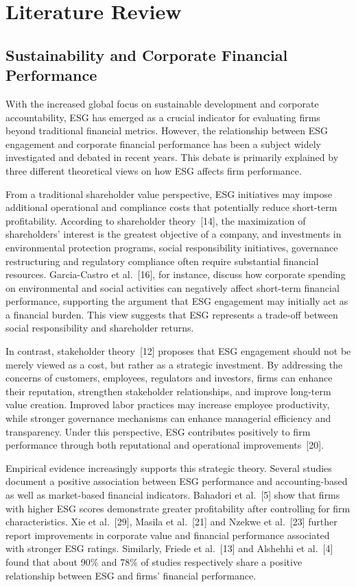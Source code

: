 \documentclass[12pt]{article}
\begin{document}
\section{Literature Review}\label{sec:lit}

\subsection{Sustainability and Corporate Financial Performance}
With the increased global focus on sustainable development and corporate accountability, ESG has emerged as a crucial indicator for evaluating firms beyond traditional financial metrics. However, the relationship between ESG engagement and corporate financial performance has been a subject widely investigated and debated in recent years. This debate is primarily explained by three different theoretical views on how ESG affects firm performance.

From a traditional shareholder value perspective, ESG initiatives may impose additional operational and compliance costs that potentially reduce short-term profitability. According to shareholder theory~[14], the maximization of shareholders' interest is the greatest objective of a company, and investments in environmental protection programs, social responsibility initiatives, governance restructuring and regulatory compliance often require substantial financial resources. Garcia-Castro et al.~[16], for instance, discuss how corporate spending on environmental and social activities can negatively affect short-term financial performance, supporting the argument that ESG engagement may initially act as a financial burden. This view suggests that ESG represents a trade-off between social responsibility and shareholder returns.

In contrast, stakeholder theory~[12] proposes that ESG engagement should not be merely viewed as a cost, but rather as a strategic investment. By addressing the concerns of customers, employees, regulators and investors, firms can enhance their reputation, strengthen stakeholder relationships, and improve long-term value creation. Improved labor practices may increase employee productivity, while stronger governance mechanisms can enhance managerial efficiency and transparency. Under this perspective, ESG contributes positively to firm performance through both reputational and operational improvements~[20].

Empirical evidence increasingly supports this strategic theory. Several studies document a positive association between ESG performance and accounting-based as well as market-based financial indicators. Bahadori et al.~[5] show that firms with higher ESG scores demonstrate greater profitability after controlling for firm characteristics. Xie et al.~[29], Masila et al.~[21] and Nzekwe et al.~[23] further report improvements in corporate value and financial performance associated with stronger ESG ratings. Similarly, Friede et al.~[13] and Alshehhi et al.~[4] found that about 90\% and 78\% of studies respectively share a positive relationship between ESG and firms' financial performance.
\end{document}
